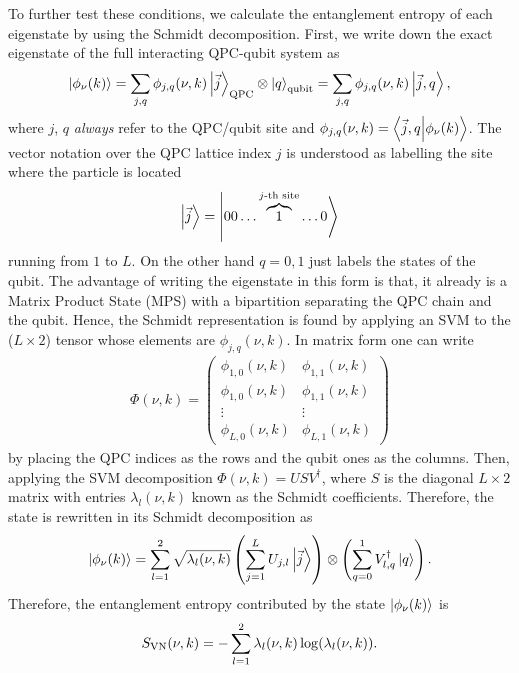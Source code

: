 \documentclass{article}
\begin{document}
To further test these conditions, we calculate the entanglement entropy of each eigenstate by using the Schmidt decomposition. First, we write down the exact eigenstate of the full interacting QPC-qubit system as
\begin{align}\label{eq:schmidt_eigenstates}
    \ket{\phi_\nu (k)} = \sum_{j,q} \phi_{j,q} (\nu, k) \ket{\vec{j}}_{\rm{QPC}}\otimes\ket{q}_{\rm{qubit}} = \sum_{j,q} \phi_{j,q} (\nu, k) \ket{\vec{j},q},
\end{align}
where $j$, $q$ \textit{always} refer to the QPC/qubit site and $\phi_{j,q} (\nu, k) = \bra{\vec{j},q} \ket{\phi_\nu (k)}$. The vector notation over the QPC lattice index $j$ is understood as labelling the site where the particle is located
\begin{align}
    \ket{\vec{j}} = \ket{00 \hdots \overbrace{1}^{j\text{-th site}} \hdots 0}
\end{align}
running from $1$ to $L$. On the other hand $q=0,1$ just labels the states of the qubit. The advantage of writing the eigenstate in this form is that, it already is a Matrix Product State (MPS) with a bipartition separating the QPC chain and the qubit. Hence, the Schmidt representation is found by applying an SVM to the ($L\times 2$) tensor whose elements are $\phi_{j,q}(\nu,k)$. In matrix form one can write
\begin{align}
    \Phi(\nu, k) = 
    \begin{pmatrix}
        \phi_{1,0}(\nu,k) & \phi_{1,1}(\nu,k) \\
        \phi_{1,0}(\nu,k) & \phi_{1,1}(\nu,k) \\
        \vdots & \vdots                        \\
        \phi_{L,0}(\nu,k) & \phi_{L,1}(\nu,k)
    \end{pmatrix}
\end{align}
by placing the QPC indices as the rows and the qubit ones as the columns. Then, applying the SVM decomposition $\Phi(\nu, k) = U S V^{\dagger}$, where $S$ is the diagonal $L\times 2$ matrix with entries $\lambda_{l}(\nu,k)$ known as the Schmidt coefficients. Therefore, the state is rewritten in its Schmidt decomposition as 
\begin{align}
    \ket{\phi_\nu (k)} = \sum_{l=1}^{2} \sqrt{\lambda_l(\nu,k)} \left( \sum_{j=1}^{L} U_{j,l} \ket{\vec{j}} \right)\otimes \left( \sum_{q=0}^{1} V_{l,q}^{\dagger} \ket{q} \right).
\end{align}
Therefore, the entanglement entropy contributed by the state $\ket{\phi_\nu (k)}$ is
\begin{align}
    S_{\rm{VN}}(\nu,k) = - \sum_{l=1}^{2} \lambda_l(\nu,k)  \log(\lambda_l(\nu,k)). 
\end{align}
\end{document}
